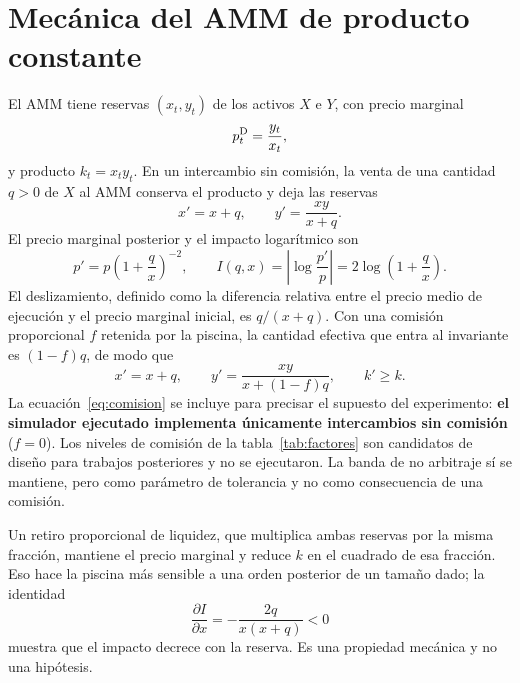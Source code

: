\section{Mecánica del AMM de producto constante}
\label{sec:amm}

El AMM tiene reservas $(x_t,y_t)$ de los activos $X$ e $Y$, con precio marginal
\begin{equation}
  p^{\mathrm{D}}_t = \frac{y_t}{x_t},
  \label{eq:precio}
\end{equation}
y producto $k_t=x_ty_t$. En un intercambio sin comisión, la venta de una cantidad $q>0$ de $X$ al AMM conserva el producto y deja las reservas
\begin{equation}
  x' = x+q,\qquad y' = \frac{xy}{x+q}.
  \label{eq:reservas}
\end{equation}
El precio marginal posterior y el impacto logarítmico son
\begin{equation}
  p' = p\left(1+\frac{q}{x}\right)^{-2},\qquad I(q,x)=\left|\log\frac{p'}{p}\right| = 2\log\left(1+\frac{q}{x}\right).
  \label{eq:impacto}
\end{equation}
El deslizamiento, definido como la diferencia relativa entre el precio medio de ejecución y el precio marginal inicial, es $q/(x+q)$. Con una comisión proporcional $f$ retenida por la piscina, la cantidad efectiva que entra al invariante es $(1-f)q$, de modo que
\begin{equation}
  x'=x+q,\qquad y'=\frac{xy}{x+(1-f)q},\qquad k'\ge k.
  \label{eq:comision}
\end{equation}
La ecuación~\eqref{eq:comision} se incluye para precisar el supuesto del experimento: \textbf{el simulador ejecutado implementa únicamente intercambios sin comisión} ($f=0$). Los niveles de comisión de la tabla~\ref{tab:factores} son candidatos de diseño para trabajos posteriores y no se ejecutaron. La banda de no arbitraje sí se mantiene, pero como parámetro de tolerancia y no como consecuencia de una comisión.

Un retiro proporcional de liquidez, que multiplica ambas reservas por la misma fracción, mantiene el precio marginal y reduce $k$ en el cuadrado de esa fracción. Eso hace la piscina más sensible a una orden posterior de un tamaño dado; la identidad
\begin{equation}
  \frac{\partial I}{\partial x} = -\frac{2q}{x(x+q)} <0
  \label{eq:dI}
\end{equation}
muestra que el impacto decrece con la reserva. Es una propiedad mecánica y no una hipótesis.

